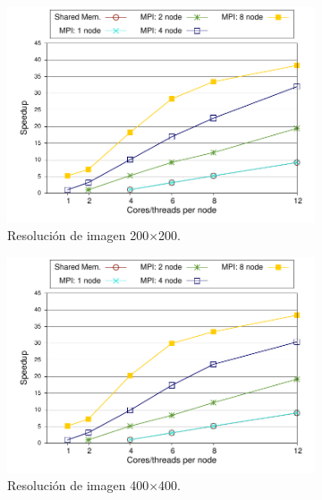 \vspace{0.35cm}
\begin{figure}[!tbp]
\centering
\begin{subfigure}[b]{0.32\textwidth}
  \centering
  \includegraphics[width=0.95\linewidth]{figures/graph-mpi-200-pfsp.pdf}
  \caption{Resolución de imagen 200$\times$200.}
  \label{fig:mandel-pfsp-200}
\end{subfigure}%
\hfill
\begin{subfigure}[b]{0.32\textwidth}
  \centering
  \includegraphics[width=0.95\linewidth]{figures/graph-mpi-400-pfsp.pdf}
  \caption{Resolución de imagen 400$\times$400.}
  \label{fig:mandel-pfsp-400}
\end{subfigure}
\hfill
\begin{subfigure}[b]{0.32\textwidth}
  \centering

\end{subfigure}
\end{figure}
